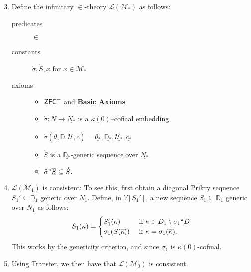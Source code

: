 \documentclass[utf8x,xcolor=svgnames,8pt]{beamer}
\newcommand{\M}{\mathcal{M}}
\newcommand{\D}{\mathbb{D}}
\newcommand{\N}{{\overline{N}}}
\renewcommand{\U}{\mathcal{U}}
\newcommand{\ZFC}{\textup{\ensuremath{\textsf{ZFC}}}}
\newcommand{\To}{\longrightarrow}
\begin{document}
\begin{frame}
\begin{enumerate} \setcounter{enumi}{2}
	\item Define the infinitary $\in$-theory $\mathcal L(\mathcal M_*)$ as follows: \begin{description}
	\item[predicates] $\in$ 
	\item[constants] $\mathring{\sigma}, \mathring S, \underline x$ for $x \in \mathcal M_*$
	\item[axioms] \begin{itemize} \item $\ZFC^-$ and \textbf{Basic Axioms}
		\item $\mathring \sigma : \underline \N \To \underline{N_*}$ is a $\underline{\overline \kappa(0)}$--cofinal embedding
		\item $\mathring{\sigma}(\overline{\underline{\theta}}, \overline{\underline{\D}}, \overline{\underline{\U}}, \overline{\underline c})=\underline{\theta_*}, \underline{\D_*}, \underline{\U_*}, \underline{c_*}$
		\item $\mathring S$ is a $\underline{\D_*}$-generic sequence over $\underline{N_*}$
		\item $\mathring \sigma ``\overline{\underline S} \subseteq \mathring S$.
	\end{itemize}
\end{description} 
	\item $\mathcal L(\M_1)$ is consistent: To see this, first obtain a diagonal Prikry sequence $S_1' \subseteq \D_1$ generic over $N_1$. Define, in $V[S_1']$, a new sequence $S_1 \subseteq \D_1$ generic over $N_1$ as follows:
$$S_1(\kappa) = \begin{cases} S_1'(\kappa) &\text{ if } \kappa \in D_1 \setminus \sigma_1``\overline D \\
					\sigma_1(\overline S(\overline \kappa)) &\text{ if } \kappa = \sigma_1(\overline \kappa). \end{cases}$$
					This works by the genericity criterion, and since $\sigma_1$ is $\overline{\kappa}(0)$-cofinal. 
	\item Using Transfer, we then have that $\mathcal L(\M_0)$ is consistent.						
	\end{enumerate}
\end{frame}
\end{document}
